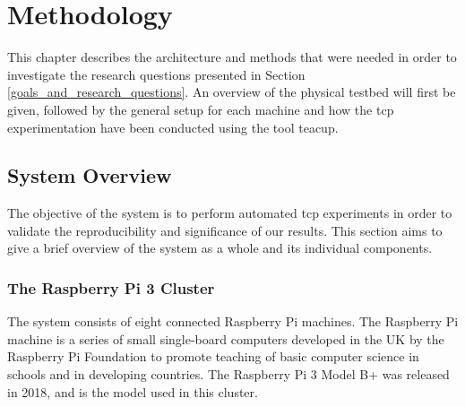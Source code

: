 \chapter{Methodology} \label{ch:methodology}

This chapter describes the architecture and methods that were needed in order to investigate the research questions presented in Section \ref{goals_and_research_questions}. An overview of the physical testbed will first be given, followed by the general setup for each machine and how the \gls{tcp} experimentation have been conducted using the tool \gls{teacup}. 









\section{System Overview}

The objective of the system is to perform automated \gls{tcp} experiments in order to validate the reproducibility and significance of our results. This section aims to give a brief overview of the system as a whole and its individual components.




\subsection{The Raspberry Pi 3 Cluster}

The system consists of eight connected Raspberry Pi machines. The Raspberry Pi machine is a series of small single-board computers developed in the UK by the Raspberry Pi Foundation to promote teaching of basic computer science in schools and in developing countries. The Raspberry Pi 3 Model B+ was released in 2018, and is the model used in this cluster.


